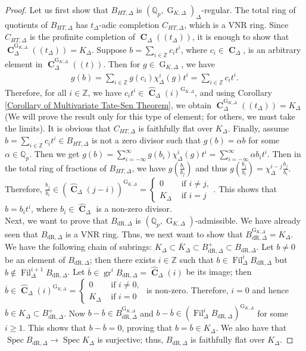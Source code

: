 \documentclass{amsart}
\DeclareMathOperator{\spec}{Spec}
\newcommand{\mCHT}{C_{HT,\Delta}}
\DeclareMathOperator{\C}{\textbf{C}}
\DeclareMathOperator{\gr}{gr}
\newcommand{\mBdrp}{B^+_{\mathrm{dR},\Delta}}
\newcommand{\mBdr}{B_{\mathrm{dR},\Delta}}
\newcommand{\mBHT}{B_{HT,\Delta}}
\DeclareMathOperator{\G}{G}
\DeclareMathOperator{\Fil}{Fil}
\begin{document}
\begin{proof}
    Let us first show that $\mBHT$ is $(\mathbb{Q}_p,\G_{K,\Delta})_\Delta$-regular. The total ring of quotients of $\mBHT$ has $t_\Delta$-adic completion $\mCHT$, which is a VNR ring. Since $\mCHT$ is the profinite completion of $\C_\Delta(\!(t_\Delta)\!)$, it is enough to show that $\C_\Delta^{\G_{K,\Delta}}(\!(t_\Delta)\!)=K_\Delta$. Suppose $b=\sum\limits_{i\in\mathbb{Z}}c_it^i$, where $c_i\in\C_\Delta$, is an arbitrary element in $\C^{\G_{K,\Delta}}_\Delta((t))$. Then for $g\in\G_{K,\Delta}$, we have
    \begin{align*}
        g(b)=\sum\limits_{i\in\mathbb{Z}}g(c_i)\chi_\Delta^i(g)t^i=\sum\limits_{i\in\mathbb{Z}}c_it^i.
    \end{align*}
    Therefore, for all $i\in\mathbb{Z}$, we have $c_it^i\in\widehat{\C}_\Delta(i)^{\G_{K,\Delta}}$, and using Corollary \ref{Corollary of Multivariate Tate-Sen Theorem}, we obtain $\C^{\G_{K,\Delta}}_\Delta(\!(t_\Delta)\!)=K_\Delta$ (We will prove the result only for this type of element; for others, we must take the limits). It is obvious that $\mCHT$ is faithfully flat over $K_\Delta$. Finally, assume $b=\sum\limits_{i\in\mathbb{Z}}c_it^i\in\mBHT$ is not a zero divisor such that $g(b)=\alpha b$ for some $\alpha\in\mathbb{Q}_p$. Then we get $g(b)=\sum\limits_{i=-\infty}^\infty g(b_i)\chi^i_\Delta(g)t^i=\sum\limits_{i=-\infty}^\infty \alpha b_it^i$. Then in the total ring of fractions of $\mBHT$, we have $g\left(\frac{b_i}{b_j}\right)$ and thus $g\left(\frac{b_j}{b_i}\right)=\chi_\Delta^{i-j}\frac{b_j}{b_i}$. Therefore, $\frac{b_j}{b_i}\in\left(\widehat{\C}_\Delta(j-i)\right)^{\G_{K,\Delta}}=\begin{cases}
        0 &\text{ if }i\neq j,\\
        K_\Delta &\text{ if }i=j
    \end{cases}$. This shows that $b=b_{i}t^i$, where $b_i\in\widehat{\C}_\Delta$ is a non-zero divisor.\\

    Next, we want to prove that $\mBdr$ is $(\mathbb{Q}_p,\G_{K,\Delta})$-admissible. We have already seen that $\mBdr$ is a VNR ring. Thus, we next want to show that $\mBdr^{\G_{K,\Delta}}=K_\Delta$. We have the following chain of subrings: $K_\Delta\subset \overline{K}_\Delta\subset\mBdrp\subset\mBdr$. Let $b\neq 0$ be an element of $\mBdr$; then there exists $i\in\mathbb{Z}$ such that $b\in\Fil^i_\Delta\mBdr$ but $b\notin\Fil^{i+1}_\Delta\mBdr$. Let $\overline{b}\in\gr^i\mBdr=\widehat{\C}_\Delta(i)$ be its image; then $\overline{b}\in\widehat{\C}_\Delta(i)^{\G_{K,\Delta}}=\begin{cases}
        0 &\text{ if }i\neq 0,\\
        K_\Delta &\text{ if }i=0
    \end{cases}$ is non-zero. Therefore, $i=0$ and hence $\overline{b}\in K_\Delta\subset\mBdrp$. Now $b-\overline{b}\in\mBdr^{\G_{K,\Delta}}$ and $b-\overline{b}\in(\Fil^i_\Delta\mBdr)^{\G_{K,\Delta}}$ for some $i\geq 1$. This shows that $b-\overline{b}=0$, proving that $b=\overline{b}\in K_\Delta$. We also have that $\spec\mBdr\to \spec K_\Delta$ is surjective; thus, $\mBdr$ is faithfully flat over $K_\Delta$.
\end{proof}
\end{document}
